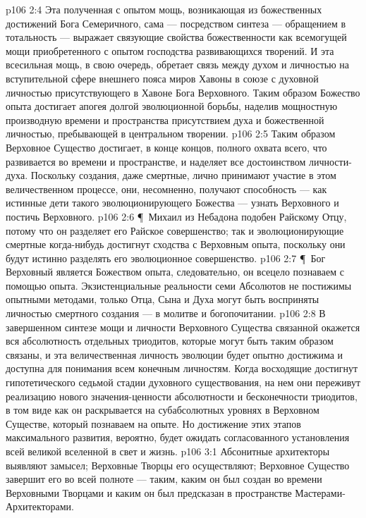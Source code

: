 \vs p106 2:4 Эта полученная с опытом мощь, возникающая из божественных достижений Бога Семеричного, сама --- посредством синтеза --- обращением в тотальность --- выражает связующие свойства божественности как всемогущей мощи приобретенного с опытом господства развивающихся творений. И эта всесильная мощь, в свою очередь, обретает связь между духом и личностью на вступительной сфере внешнего пояса миров Хавоны в союзе с духовной личностью присутствующего в Хавоне Бога Верховного. Таким образом Божество опыта достигает апогея долгой эволюционной борьбы, наделив мощностную производную времени и пространства присутствием духа и божественной личностью, пребывающей в центральном творении.
\vs p106 2:5 Таким образом Верховное Существо достигает, в конце концов, полного охвата всего, что развивается во времени и пространстве, и наделяет все достоинством личности\hyp{}духа. Поскольку создания, даже смертные, лично принимают участие в этом величественном процессе, они, несомненно, получают способность --- как истинные дети такого эволюционирующего Божества --- узнать Верховного и постичь Верховного.
\vs p106 2:6 \P\ Михаил из Небадона подобен Райскому Отцу, потому что он разделяет его Райское совершенство; так и эволюционирующие смертные когда\hyp{}нибудь достигнут сходства с Верховным опыта, поскольку они будут истинно разделять его эволюционное совершенство.
\vs p106 2:7 \P\ Бог Верховный является Божеством опыта, следовательно, он всецело познаваем с помощью опыта. Экзистенциальные реальности семи Абсолютов не постижимы опытными методами, только  Отца, Сына и Духа могут быть восприняты личностью смертного создания --- в молитве и богопочитании.
\vs p106 2:8 В завершенном синтезе мощи и личности Верховного Существа связанной окажется вся абсолютность отдельных триодитов, которые могут быть таким образом связаны, и эта величественная личность эволюции будет опытно достижима и доступна для понимания всем конечным личностям. Когда восходящие достигнут гипотетического седьмой стадии духовного существования, на нем они переживут реализацию нового значения\hyp{}ценности абсолютности и бесконечности триодитов, в том виде как он раскрывается на субабсолютных уровнях в Верховном Существе, который познаваем на опыте. Но достижение этих этапов максимального развития, вероятно, будет ожидать согласованного установления всей великой вселенной в свет и жизнь.
\vs p106 3:1 Абсонитные архитекторы выявляют замысел; Верховные Творцы его осуществляют; Верховное Существо завершит его во всей полноте --- таким, каким он был создан во времени Верховными Творцами и каким он был предсказан в пространстве Мастерами\hyp{}Архитекторами.
